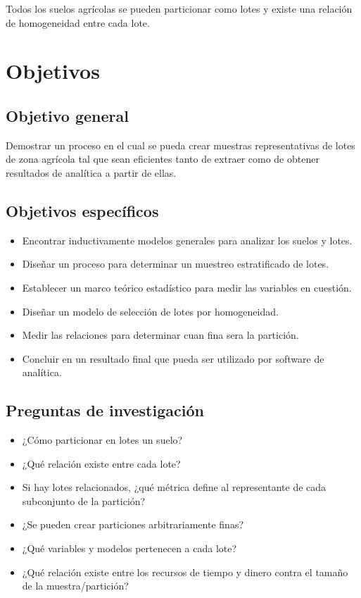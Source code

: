\documentclass{report}
\begin{document}
Todos los suelos agrícolas se pueden particionar como lotes y existe una relación de homogeneidad entre cada lote.

\section{Objetivos}


\subsection{Objetivo general}

Demostrar un proceso en el cual se pueda crear muestras representativas de lotes de zona agrícola tal que sean eficientes tanto de extraer como de obtener resultados de analítica a partir de ellas.

\subsection{Objetivos específicos}

\begin{itemize}
    \item Encontrar inductivamente modelos generales para analizar los suelos y lotes. 
    \item Diseñar un proceso para determinar un muestreo estratificado de lotes.
    \item Establecer un marco teórico estadístico para medir las variables en cuestión.
    \item Diseñar un modelo de selección de lotes por homogeneidad.
    \item Medir las relaciones para determinar cuan fina sera la partición.
    \item Concluir en un resultado final que pueda ser utilizado por software de analítica.
\end{itemize}


\subsection{Preguntas de investigación}

\begin{itemize}
    \item ¿Cómo particionar en lotes un suelo?
    \item ¿Qué relación existe entre cada lote?
    \item Si hay lotes relacionados, ¿qué métrica define al representante de cada subconjunto de la partición?
    \item ¿Se pueden crear particiones arbitrariamente finas?
    
    \item ¿Qué variables y modelos pertenecen a cada lote?
    \item ¿Qué relación existe entre los recursos de tiempo y dinero contra el tamaño de la muestra/partición?
\end{itemize}
\end{document}
